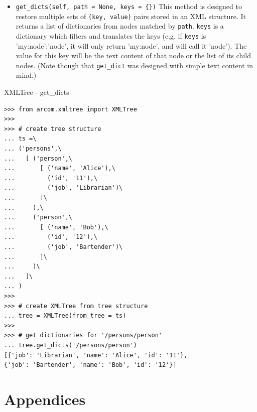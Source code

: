 \documentclass{article}
\begin{document}
\begin{flushleft}
\begin{itemize}
{    \begin{itemize}
      \item{ \verb$get_dicts(self, path = None, keys = {})$ \linebreak
      This method is designed to restore multiple sets of \verb$(key, value)$ pairs stored 
      in an XML structure. It returns a list of dictionaries from nodes matched by \verb$path$.
      \verb$keys$ is a dictionary which filters and translates the keys
      (e.g. if \verb$keys$ is {'my:node':'node'}, it will only return
      'my:node', and will call it 'node'). The value for this key will be 
      the text content of that node or the list of its child nodes.
      (Note though that \verb$get_dict$ was designed with simple text content in mind.)
      }
    \end{itemize}

    \begin{example}
      \caption{XMLTree - get\_dicts}\label{xtgetdicts}
\begin{verbatim}
>>> from arcom.xmltree import XMLTree
>>> 
>>> # create tree structure
... ts =\
... ('persons',\
...   [ ('person',\
...       [ ('name', 'Alice'),\
...         ('id', '11'),\
...         ('job', 'Librarian')\
...       ]\
...     ),\
...     ('person',\
...       [ ('name', 'Bob'),\
...         ('id', '12'),\
...         ('job', 'Bartender')\
...       ]\
...     )\
...   ]\
... )
>>> 
>>> # create XMLTree from tree structure
... tree = XMLTree(from_tree = ts)
>>> 
>>> # get dictionaries for '/persons/person'
... tree.get_dicts('/persons/person')
[{'job': 'Librarian', 'name': 'Alice', 'id': '11'}, 
{'job': 'Bartender', 'name': 'Bob', 'id': '12'}]
\end{verbatim}
    \end{example}

  }
\end{itemize}

\end{flushleft}

\section*{Appendices}
\appendix
\end{document}
